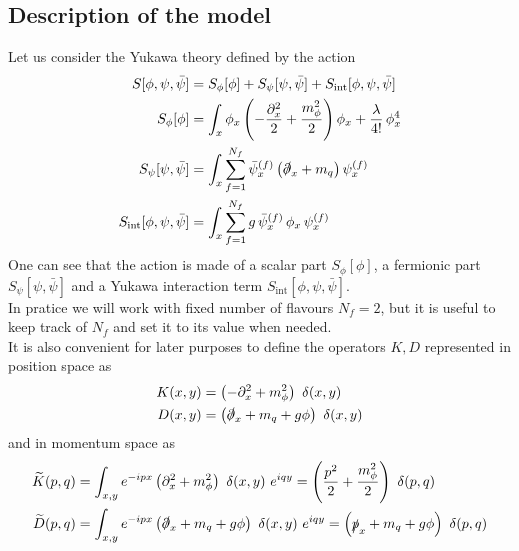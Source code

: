 \subsection{Description of the model}
Let us consider the Yukawa theory defined by the action
\begin{equation}
\begin{aligned}
    S[\phi,\psi,\bar\psi] &= S_\phi[\phi] + S_\psi[\psi, \bar\psi] + S_\text{int}[\phi, \psi, \bar\psi]\\
     S_\phi[\phi] &= \int_x \phi_x \left(-\frac{\partial^2_x}{2} + \frac{m_\phi^2}{2}\right) \phi_x + \frac{\lambda}{4!} \, \phi_x^4 \\
     S_\psi[\psi, \bar\psi] &= \int_x \sum_{f=1}^{N_f} \bar \psi_x^{(f)} \left(\slashed{\partial}_x + m_q \right) \psi_x^{(f)} \\
     S_\text{int}[\phi, \psi, \bar\psi] &= \int_x \sum_{f=1}^{N_f} g \, \bar \psi_x^{(f)} \, \phi_x \, \psi_x^{(f)}
    \label{eq:full_action_continuum}
\end{aligned}
\end{equation}
One can see that the action is made of a scalar part $S_\phi[\phi]$, a fermionic part $S_\psi[\psi, \bar\psi]$ and a Yukawa interaction term $S_\text{int}[\phi, \psi, \bar\psi]$. \\
In pratice we will work with fixed number of flavours $N_f = 2$, but it is useful to keep track of $N_f$ and set it to its value when needed. \\
It is also convenient for later purposes to define the operators $K, D$ represented in position space as 
\begin{equation}
    \begin{aligned}
        K(x, y) &=  \left(-\partial^2_x + m_\phi^2\right) \ \delta(x,y) \\
        D(x, y) &= \left(\slashed{\partial}_x + m_q + g\phi \right) \ \delta(x,y)
    \end{aligned}
    \label{eq:definition_kinetic_terms_continuum_position}
\end{equation}
and in momentum space as
\begin{equation}
    \begin{aligned}
        \widetilde{K}(p, q) &=  \int_{x,y} e^{-ipx} \left(\partial^2_x + m_\phi^2\right) \ \delta(x,y) \ e^{iqy} = \left(\frac{p^2}{2} + \frac{m_\phi^2}{2}\right) \ \delta(p,q) \\
        \widetilde{D}(p, q) &= \int_{x,y} e^{-ipx} \left(\slashed{\partial}_x + m_q + g\phi \right) \ \delta(x,y) \ e^{iqy} = \left(\slashed{p}_x + m_q + g\phi \right) \ \delta(p,q)
    \end{aligned}
    \label{eq:definition_kinetic_terms_continuum_momentum}
\end{equation}

